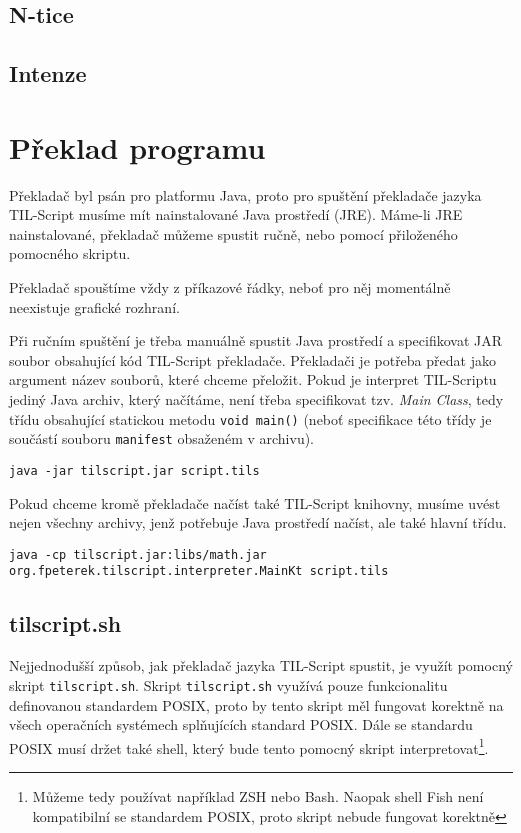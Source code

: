 \subsection{N-tice}

\subsection{Intenze}

\section{Překlad programu}

Překladač byl psán pro platformu Java, proto pro spuštění překladače jazyka TIL-Script musíme mít
nainstalované Java prostředí (JRE). Máme-li JRE nainstalované, překladač můžeme spustit ručně, nebo
pomocí přiloženého pomocného skriptu.

Překladač spouštíme vždy z příkazové řádky, neboť pro něj momentálně neexistuje grafické rozhraní.

Při ručním spuštění je třeba manuálně spustit Java prostředí a specifikovat JAR soubor obsahující
kód TIL-Script překladače. Překladači je potřeba předat jako argument název souborů, které chceme
přeložit. Pokud je interpret TIL-Scriptu jediný Java archiv, který načítáme, není třeba specifikovat
tzv. \textit{Main Class}, tedy třídu obsahující statickou metodu \lstinline{void main()} (neboť
specifikace této třídy je součástí souboru \lstinline{manifest} obsaženém v archivu).

\begin{lstlisting}[caption={Spuštění překladače}]
java -jar tilscript.jar script.tils
\end{lstlisting}

Pokud chceme kromě překladače načíst také TIL-Script knihovny, musíme uvést nejen všechny archivy,
jenž potřebuje Java prostředí načíst, ale také hlavní třídu.

\begin{lstlisting}[caption={Spuštění překladače s načtením knihoven}]
java -cp tilscript.jar:libs/math.jar org.fpeterek.tilscript.interpreter.MainKt script.tils
\end{lstlisting}

\subsection{tilscript.sh}

Nejjednodušší způsob, jak překladač jazyka TIL-Script spustit, je využít pomocný skript
\lstinline{tilscript.sh}. Skript \lstinline{tilscript.sh} využívá pouze funkcionalitu definovanou
standardem POSIX, proto by tento skript měl fungovat korektně na všech operačních systémech
splňujících standard POSIX. Dále se standardu POSIX musí držet také shell, který bude tento pomocný
skript interpretovat\footnote{Můžeme tedy používat například ZSH nebo Bash. Naopak shell Fish není
kompatibilní se standardem POSIX, proto skript nebude fungovat korektně}.

